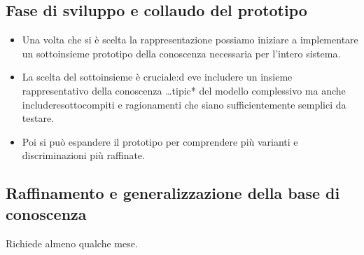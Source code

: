 \subsection{Fase di sviluppo e collaudo del prototipo}

\begin{itemize}
  \item{Una volta che si \`e scelta la rappresentazione} possiamo iniziare a implementare un sottoinsieme prototipo della conoscenza necessaria per l'intero sistema.
  \item{La scelta del sottoinsieme \`e cruciale:}d eve includere un insieme rappresentativo della conoscenza \dots tipic* del modello complessivo
  ma anche includeresottocompiti e ragionamenti che siano sufficientemente semplici da testare.
  \item{Poi} si pu\`o espandere il prototipo per comprendere pi\`u varianti e discriminazioni pi\`u raffinate.
\end{itemize}


\subsection{Raffinamento e generalizzazione della base di conoscenza}
Richiede almeno qualche mese.